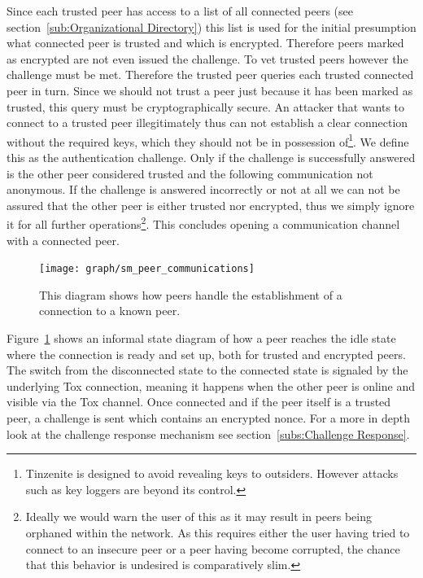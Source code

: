 Since each trusted peer has access to a list of all connected peers (see section~\ref{sub:Organizational Directory}) this list is used for the initial presumption what connected peer is trusted and which is encrypted.
Therefore peers marked as encrypted are not even issued the challenge.
To vet trusted peers however the challenge must be met.
Therefore the trusted peer queries each trusted connected peer in turn.
Since we should not trust a peer just because it has been marked as trusted, this query must be cryptographically secure.
An attacker that wants to connect to a trusted peer illegitimately thus can not establish a clear connection without the required keys, which they should not be in possession of\footnote{Tinzenite is designed to avoid revealing keys to outsiders. However attacks such as key loggers are beyond its control.}.
We define this as the authentication challenge.
Only if the challenge is successfully answered is the other peer considered trusted and the following communication not anonymous.
If the challenge is answered incorrectly or not at all we can not be assured that the other peer is either trusted nor encrypted, thus we simply ignore it for all further operations\footnote{Ideally we would warn the user of this as it may result in peers being orphaned within the network. As this requires either the user having tried to connect to an insecure peer or a peer having become corrupted, the chance that this behavior is undesired is comparatively slim.}.
This concludes opening a communication channel with a connected peer.

\begin{figure}[htp]
\centering
    \texttt{[image: graph/sm\_peer\_communications]}
\caption[Connection State Diagram]{This diagram shows how peers handle the establishment of a connection to a known peer.}
\label{graph:connection_states}
\end{figure}

Figure~\ref{graph:connection_states} shows an informal state diagram of how a peer reaches the idle state where the connection is ready and set up, both for trusted and encrypted peers.
The switch from the disconnected state to the connected state is signaled by the underlying Tox connection, meaning it happens when the other peer is online and visible via the Tox channel.
Once connected and if the peer itself is a trusted peer, a challenge is sent which contains an encrypted nonce.
For a more in depth look at the challenge response mechanism see section~\ref{subs:Challenge Response}.

